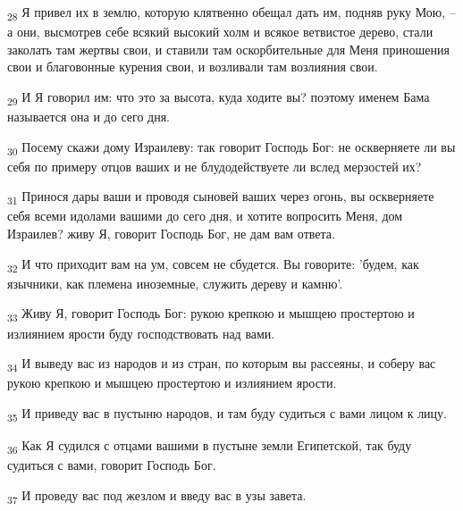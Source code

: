 \begin{tcolorbox}
\textsubscript{28} Я привел их в землю, которую клятвенно обещал дать им, подняв руку Мою, --а они, высмотрев себе всякий высокий холм и всякое ветвистое дерево, стали заколать там жертвы свои, и ставили там оскорбительные для Меня приношения свои и благовонные курения свои, и возливали там возлияния свои.
\end{tcolorbox}
\begin{tcolorbox}
\textsubscript{29} И Я говорил им: что это за высота, куда ходите вы? поэтому именем Бама называется она и до сего дня.
\end{tcolorbox}
\begin{tcolorbox}
\textsubscript{30} Посему скажи дому Израилеву: так говорит Господь Бог: не оскверняете ли вы себя по примеру отцов ваших и не блудодействуете ли вслед мерзостей их?
\end{tcolorbox}
\begin{tcolorbox}
\textsubscript{31} Принося дары ваши и проводя сыновей ваших через огонь, вы оскверняете себя всеми идолами вашими до сего дня, и хотите вопросить Меня, дом Израилев? живу Я, говорит Господь Бог, не дам вам ответа.
\end{tcolorbox}
\begin{tcolorbox}
\textsubscript{32} И что приходит вам на ум, совсем не сбудется. Вы говорите: 'будем, как язычники, как племена иноземные, служить дереву и камню'.
\end{tcolorbox}
\begin{tcolorbox}
\textsubscript{33} Живу Я, говорит Господь Бог: рукою крепкою и мышцею простертою и излиянием ярости буду господствовать над вами.
\end{tcolorbox}
\begin{tcolorbox}
\textsubscript{34} И выведу вас из народов и из стран, по которым вы рассеяны, и соберу вас рукою крепкою и мышцею простертою и излиянием ярости.
\end{tcolorbox}
\begin{tcolorbox}
\textsubscript{35} И приведу вас в пустыню народов, и там буду судиться с вами лицом к лицу.
\end{tcolorbox}
\begin{tcolorbox}
\textsubscript{36} Как Я судился с отцами вашими в пустыне земли Египетской, так буду судиться с вами, говорит Господь Бог.
\end{tcolorbox}
\begin{tcolorbox}
\textsubscript{37} И проведу вас под жезлом и введу вас в узы завета.
\end{tcolorbox}

